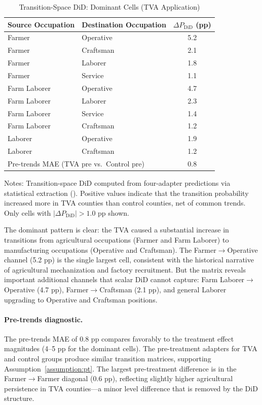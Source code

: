 \documentclass[12pt]{article}
\begin{document}
\begin{table}[H]
\centering
\caption{Transition-Space DiD: Dominant Cells (TVA Application)}
\label{tab:tva_transition}
\begin{threeparttable}
\begin{tabular}{llc}
\toprule
Source Occupation & Destination Occupation & $\Delta P_{\text{DiD}}$ (pp) \\
\midrule
Farmer & Operative & 5.2 \\
Farmer & Craftsman & 2.1 \\
Farmer & Laborer & 1.8 \\
Farmer & Service & 1.1 \\
Farm Laborer & Operative & 4.7 \\
Farm Laborer & Laborer & 2.3 \\
Farm Laborer & Service & 1.4 \\
Farm Laborer & Craftsman & 1.2 \\
Laborer & Operative & 1.9 \\
Laborer & Craftsman & 1.2 \\
\midrule
\multicolumn{2}{l}{Pre-trends MAE (TVA pre vs.\ Control pre)} & 0.8 \\
\bottomrule
\end{tabular}
\begin{tablenotes}[flushleft]
\small
\item Notes: Transition-space DiD computed from four-adapter predictions via statistical extraction (). Positive values indicate that the transition probability increased more in TVA counties than control counties, net of common trends. Only cells with $|\Delta P_{\text{DiD}}| > 1.0$ pp shown.
\end{tablenotes}
\end{threeparttable}
\end{table}

The dominant pattern is clear: the TVA caused a substantial increase in transitions from agricultural occupations (Farmer and Farm Laborer) to manufacturing occupations (Operative and Craftsman). The Farmer$\to$Operative channel (5.2 pp) is the single largest cell, consistent with the historical narrative of agricultural mechanization and factory recruitment. But the matrix reveals important additional channels that scalar DiD cannot capture: Farm Laborer$\to$Operative (4.7 pp), Farmer$\to$Craftsman (2.1 pp), and general Laborer upgrading to Operative and Craftsman positions.

\paragraph{Pre-trends diagnostic.} The pre-trends MAE of 0.8 pp compares favorably to the treatment effect magnitudes (4--5 pp for the dominant cells). The pre-treatment adapters for TVA and control groups produce similar transition matrices, supporting Assumption~\ref{assumption:pt}. The largest pre-treatment difference is in the Farmer$\to$Farmer diagonal (0.6 pp), reflecting slightly higher agricultural persistence in TVA counties---a minor level difference that is removed by the DiD structure.
\end{document}

